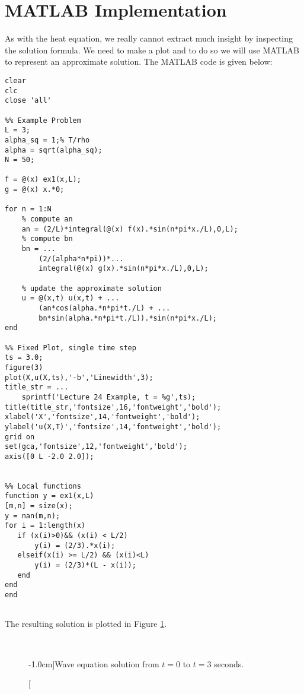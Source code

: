 \section{MATLAB Implementation}
As with the heat equation, we really cannot extract much insight by inspecting the solution formula.  We need to make a plot and to do so we will use MATLAB to represent an approximate solution.
The MATLAB code is given below:
\begin{lstlisting}[name=lec24_ex, style=myMatlab]
clear
clc
close 'all'

%% Example Problem
L = 3;
alpha_sq = 1;% T/rho
alpha = sqrt(alpha_sq);
N = 50;

f = @(x) ex1(x,L);
g = @(x) x.*0;

for n = 1:N
    % compute an
    an = (2/L)*integral(@(x) f(x).*sin(n*pi*x./L),0,L);
    % compute bn
    bn = ...
        (2/(alpha*n*pi))*...
        integral(@(x) g(x).*sin(n*pi*x./L),0,L);
    
    % update the approximate solution
    u = @(x,t) u(x,t) + ...
        (an*cos(alpha.*n*pi*t./L) + ...
        bn*sin(alpha.*n*pi*t./L)).*sin(n*pi*x./L); 
end

%% Fixed Plot, single time step
ts = 3.0;
figure(3)
plot(X,u(X,ts),'-b','Linewidth',3);
title_str = ...
    sprintf('Lecture 24 Example, t = %g',ts);
title(title_str,'fontsize',16,'fontweight','bold');
xlabel('X','fontsize',14,'fontweight','bold');
ylabel('u(X,T)','fontsize',14,'fontweight','bold');
grid on
set(gca,'fontsize',12,'fontweight','bold');
axis([0 L -2.0 2.0]);


%% Local functions
function y = ex1(x,L)
[m,n] = size(x);
y = nan(m,n);
for i = 1:length(x)
   if (x(i)>0)&& (x(i) < L/2)
       y(i) = (2/3).*x(i);
   elseif(x(i) >= L/2) && (x(i)<L)
       y(i) = (2/3)*(L - x(i));
   end
end
end


\end{lstlisting}
The resulting solution is plotted in Figure \ref{fig:lec24-ex1}.
\begin{fullwidth}
\begin{figure}
\\
\label{fig:lec24-ex1}
\caption[][-1.0cm]{Wave equation solution from $t=0$ to $t=3$ seconds.}
\end{figure}
\end{fullwidth}

